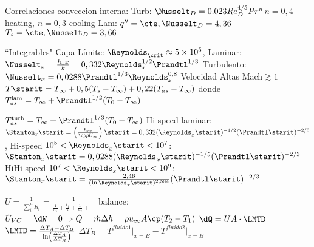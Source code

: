 \vspace{\formuleoseparator}
\begin{formuleo}
 Correlaciones conveccion interna: Turb: $\Nusselt_{D}=0.023 R e_{D}^{4 / 5} P r^{n}$\going $n=0,4$ heating, $n=0,3$ cooling \separar Lam: $q''=\cte, \Nusselt_D=4,36$\going$T_s=\cte, \Nusselt_D = 3,66$  \separar
 
 ``Integrables"{} Capa Límite: $\Reynolds_{\crit}\approx5\times10^{5}$, Laminar:$\Nusselt_x=\frac{h_x x}{k}=0,332 \Reynolds_x^{1/2}\Prandtl^{1/3}$ \separar Turbulento: $\Nusselt_x = 0,0288\Prandtl^{1/3} \Reynolds_x^{0,8}$  \separar Velocidad Altas Mach$\gtrsim1$ $T\starit = T_\infty +0,5(T_s-T_\infty)+0,22(T_{as}-T_{\infty})$ donde $T_{as}^{\mathrm{lam}}=T_\infty+\Prandtl^{1/2}(T_0-T_\infty)$
 
 $T_{as}^{\mathrm{turb}}=T_\infty+\Prandtl^{1/3}(T_0-T_\infty)$ Hi-speed laminar: $\Stanton_x\starit=\left( \frac{h_{cx}}{\cp \rho U_\infty}\right)\starit=0,332(\Reynolds_x\starit)^{-1/2} (\Prandtl\starit)^{-2/3}$, Hi-speed $10^5<\Reynolds_x\starit<10^7$: $\Stanton_x\starit=0,0288(\Reynolds_x\starit)^{-1/5} (\Prandtl\starit)^{-2/3}$ \separar HiHi-speed $10^7<\Reynolds_x\starit<10^9$: $\Stanton_x\starit=\frac{2,46}{(\ln\Reynolds_x\starit)^{2,584}} (\Prandtl\starit)^{-2/3}$
\end{formuleo}
\vspace{\formuleoseparator}
\begin{formuleo}[Intercambiadores]
 $U=\frac{1}{\sum_i^n R_i}=\frac{1}{\frac{1}{h_1}+\frac{t_1}{k}+\frac{1}{h_2}+\ldots }$ \separar balance: $\dot{U}_{VC}=\dW =0 \Rightarrow \dot{Q} = \dot{m} \Delta h = \rho u_{\infty} A \cp  (T_2-T_1)$ 
\newline
\separar $\dQ = U A \cdot \LMTD $ \separar $\LMTD=\frac{\Delta T_{A}-\Delta T_{B}}{\ln \left(\frac{\Delta T_{A}}{\Delta T_{B}}\right)}$ \separar $\Delta T_{B} = T^{fluido 1}\big|_{x=B}-T^{fluido 2}\big|_{x=B}$
\end{formuleo}